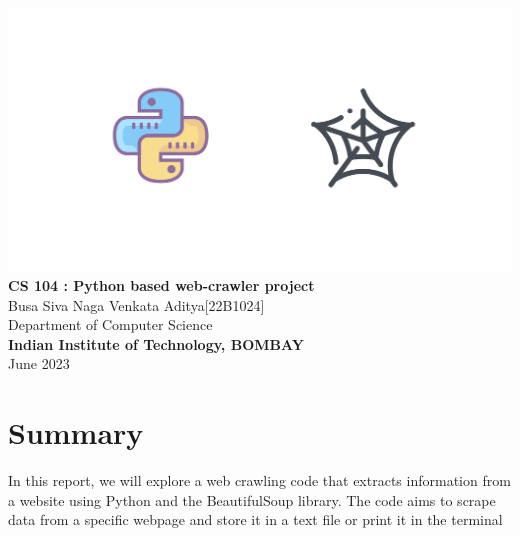 \documentclass{article}
\begin{document}
\begin{titlepage}
    \vspace*{\fill} %
    \begin{center}
        \includegraphics[width=15cm]{cover.png}\\[0.5 cm] %
        {\LARGE \textbf{CS 104 : Python based web-crawler project}}\\[3 cm] %
        {\large Busa Siva Naga Venkata Aditya[22B1024]}\\[0.5 cm] %
        {\large Department of Computer Science}\\[0.5 cm] %
        {\large \textbf{Indian Institute of Technology, BOMBAY}}\\[0.5 cm]
        {\large June 2023}\\[1cm] %
    \end{center}
    \vspace*{\fill} %
\end{titlepage}

\newpage
\section{Summary}
{ In this report, we will explore a web crawling code that extracts information from a website using Python and the BeautifulSoup library. The code aims to scrape data from a specific webpage and store it in a text file or print it in the terminal}
\end{document}
